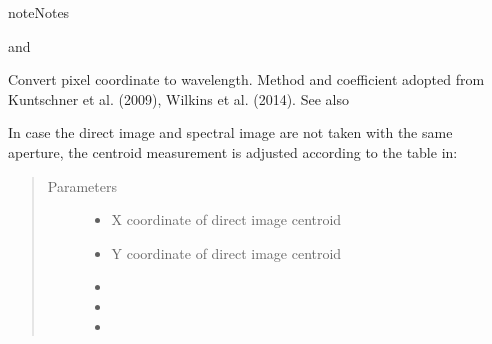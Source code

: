 \documentclass[a4paper,10pt,english]{sphinxmanual}
\begin{document}
\begin{fulllineitems}
\begin{fulllineitems}
\begin{sphinxadmonition}{note}{Notes}
\begin{description}
\item[{and}] \leavevmode
{}

\end{description}
\end{sphinxadmonition}

\end{fulllineitems}


\begin{fulllineitems}
\label{\detokenize{cascade.instruments:cascade.instruments.instruments.HSTWFC3._WFC3Dispersion}}
Convert pixel coordinate to wavelength. Method and coefficient
adopted from Kuntschner et al. (2009), Wilkins et al. (2014). See also

In case the direct image and spectral image are not taken with the
same aperture, the centroid measurement is adjusted according to the
table in: 
\begin{quote}\begin{description}
\item[{Parameters}] \leavevmode\begin{itemize}
\item {} 
 \textendash{} X coordinate of direct image centroid

\item {} 
 \textendash{} Y coordinate of direct image centroid

\item {} 
 \textendash{} 

\item {} 
 \textendash{} 

\item {} 
 \textendash{} 


\end{itemize}
\end{description}
\end{quote}
\end{fulllineitems}
\end{fulllineitems}
\end{document}
